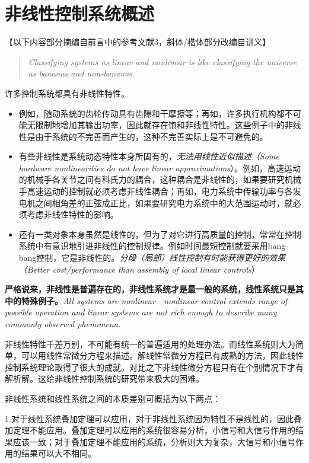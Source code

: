 \section{非线性控制系统概述}
【以下内容部分摘编自前言中的参考文献3，斜体/楷体部分改编自讲义】
\begin{quote}
  \textit{Classifying systems as linear and nonlinear is like classifying the universe as bananas and non-bananas.}
\end{quote}
许多控制系统都具有非线性特性。
\begin{itemize}[leftmargin=2em]
  \item 例如，随动系统的齿轮传动具有齿隙和干摩擦等；再如，许多执行机构都不可能无限制地增加其输出功率，因此就存在饱和非线性特性。这些例子中的非线性是由于系统的不完善而产生的，这种不完善实际上是不可避免的。
  \item 有些非线性是系统动态特性本身所固有的，{\it 无法用线性近似描述（Some hardware nonlinearities do not have linear approximations}）。例如，高速运动的机械手各关节之间有科氏力的耦合，这种耦合是非线性的，如果要研究机械手高速运动的控制就必须考虑非线性耦合；再如，电力系统中传输功率与各发电机之间相角差的正弦成正比，如果要研究电力系统中的大范围运动时，就必须考虑非线性特性的影响。
  \item 还有一类对象本身虽然是线性的，但为了对它进行高质量的控制，常常在控制系统中有意识地引进非线性的控制规律。例如时间最短控制就要采用bang-bang控制，它是非线性的。{\it 分段（局部）线性控制有时能获得更好的效果（Better cost/performance than assembly of local linear controls}）
\end{itemize}

{\bf 严格说来，非线性是普遍存在的，非线性系统才是最一般的系统，线性系统只是其中的特殊例子。}{\it All systems are nonlinear---nonlinear control extends range of
possible operation and linear systems are not rich enough to describe many
commonly observed phenomena.}

非线性特性千差万别，不可能有统一的普遍适用的处理办法。而线性系统则大为简单，可以用线性常微分方程来描述。解线性常微分方程已有成熟的方法，因此线性控制系统理论取得了很大的成就。对比之下非线性微分方程只有在个别情况下才有解析解。这给非线性控制系统的研究带来极大的困难。

非线性系统和线性系统之间的本质差别可概括为以下两点：

1.对于线性系统叠加定理可以应用，对于非线性系统因为特性不是线性的，因此叠加定理不能应用。叠加定理可以应用的系统很容易分析，小信号和大信号作用的结果应该一致；对于叠加定理不能应用的系统，分析则大为复杂，大信号和小信号作用的结果可以大不相同。

